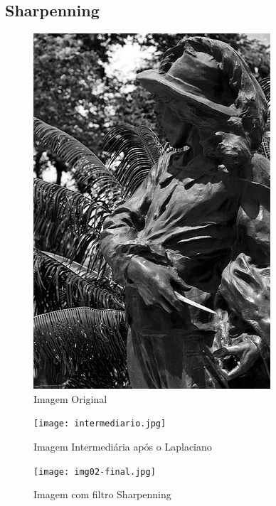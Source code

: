 \documentclass[11pt,a4paper]{article}
\begin{document}
\subsection{Sharpenning}
\begin{figure}[!htb]
    \centering
    \includegraphics[scale=0.3]{img02.jpg}
    \caption{Imagem Original}
    \label{img5}
\end{figure}
\begin{figure}[!htb]
    \centering
    \texttt{[image: intermediario.jpg]}
    \caption{Imagem Intermediária após o Laplaciano}
    \label{interm}
\end{figure}
\begin{figure}[!htb]
    \centering
    \texttt{[image: img02-final.jpg]}
    \caption{Imagem com filtro Sharpenning}
    \label{img5-f}
\end{figure}
\end{document}
